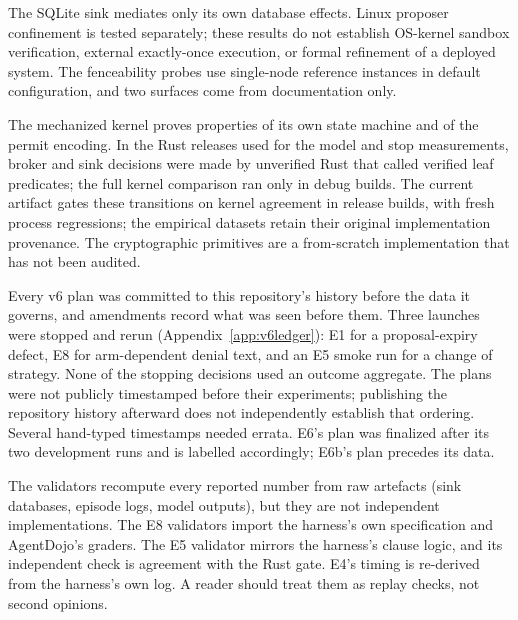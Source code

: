  The SQLite sink mediates only its own database effects. Linux proposer confinement is
tested separately; these results do not establish OS-kernel sandbox verification, external exactly-once execution,
or formal refinement of a deployed system. The fenceability probes use single-node
reference instances in default configuration, and two surfaces come from documentation only.

 The mechanized kernel proves properties of its own state machine and of the permit
encoding. In the Rust releases used for the model and stop measurements, broker and sink decisions were made by
unverified Rust that called verified leaf predicates; the full kernel comparison ran only in debug builds. The
current artifact gates these transitions on kernel agreement in release builds, with fresh process regressions;
the empirical datasets retain their original implementation provenance. The
cryptographic primitives are a from-scratch implementation that has not been audited.

 Every v6 plan was committed to this repository's history before the data it governs, and amendments record what was seen
before them. Three launches were stopped and rerun (Appendix~\ref{app:v6ledger}): E1 for a proposal-expiry defect, E8
for arm-dependent denial text, and an E5 smoke run for a change of strategy. None of the stopping decisions used an
outcome aggregate. The plans were not publicly timestamped before their experiments; publishing the repository
history afterward does not independently establish that ordering. Several hand-typed timestamps needed errata.
E6's plan was finalized after its two development runs and is labelled
accordingly; E6b's plan precedes its data.

 The validators recompute every reported number from raw artefacts (sink databases, episode logs,
model outputs), but they are not independent implementations. The E8 validators import the harness's own
specification and AgentDojo's graders. The E5 validator mirrors the harness's clause logic, and its independent check is
agreement with the Rust gate. E4's timing is re-derived from the harness's own log. A reader should treat them as replay
checks, not second opinions.

